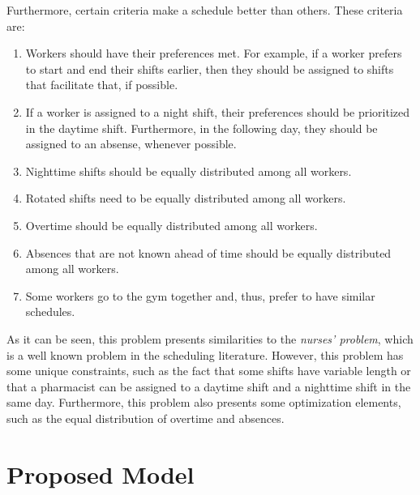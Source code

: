 \documentclass[conference]{IEEEtran}
\begin{document}
Furthermore, certain criteria make a schedule better than others. These criteria are:

\begin{enumerate}[resume]
    \item {
        \label{criterion:worker-preferences}
        Workers should have their preferences met. For example, if a worker prefers to start and end their shifts earlier, then they should be assigned to shifts that facilitate that, if possible.
    }
    \item {
        \label{criterion:nighttime-workers-prioritzation}
        If a worker is assigned to a night shift, their preferences should be prioritized in the daytime shift. Furthermore, in the following day, they should be assigned to an absense, whenever possible.
    }
    \item {
        \label{criterion:night-shifts-distribution}
        Nighttime shifts should be equally distributed among all workers.
    }
    \item {
        \label{criterion:rotated-shifts-distribution}
        Rotated shifts need to be equally distributed among all workers.
    }
    \item {
        \label{criterion:overtime-distribution}
        Overtime should be equally distributed among all workers.
    }
    \item {
        \label{criterion:absences-distribution}
        Absences that are not known ahead of time should be equally distributed among all workers.
    }
    \item {
        \label{criterion:worker-groups}
        Some workers go to the gym together and, thus, prefer to have similar schedules.
    }
\end{enumerate}

As it can be seen, this problem presents similarities to the \textit{nurses' problem}, which is a well known problem in the scheduling literature. However, this problem has some unique constraints, such as the fact that some shifts have variable length or that a pharmacist can be assigned to a daytime shift and a nighttime shift in the same day. Furthermore, this problem also presents some optimization elements, such as the equal distribution of overtime and absences.

\section{Proposed Model}
\label{section:proposed-model}
\end{document}
